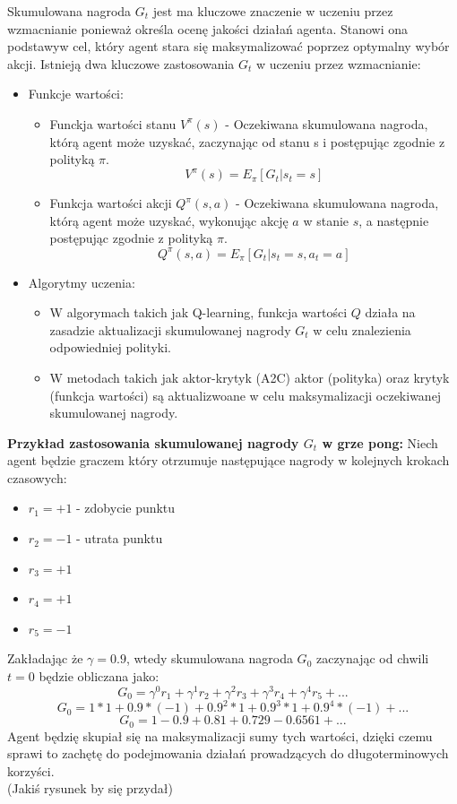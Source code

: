 \documentclass[a4paper, 12pt]{article}
\begin{document}
    Skumulowana nagroda \( G_t \) jest ma kluczowe znaczenie w uczeniu przez wzmacnianie ponieważ określa ocenę jakości działań agenta. Stanowi ona podstawyw cel, który agent stara się 
    maksymalizować poprzez optymalny wybór akcji. Istnieją dwa kluczowe zastosowania \( G_t \) w uczeniu przez wzmacnianie:
    \begin{itemize}
        \item Funkcje wartości:
        \begin{itemize}
            \item Funckja wartości stanu \( V^\pi(s) \) - Oczekiwana skumulowana nagroda, którą agent może uzyskać, zaczynając od stanu s i postępując zgodnie z polityką \( \pi \).
            \[ V^\pi(s) = E_\pi[G_t|s_t=s] \]
            \item Funkcja wartości akcji \( Q^\pi(s,a) \) - Oczekiwana skumulowana nagroda, którą agent może uzyskać, wykonując akcję \( a \) w stanie \( s \),
            a następnie postępując zgodnie z polityką \( \pi \).
            \[ Q^\pi(s,a) = E_\pi[G_t|s_t=s,a_t=a] \]
        \end{itemize}
        \item Algorytmy uczenia:
        \begin{itemize}
            \item W algorymach takich jak Q-learning, funkcja wartości \( Q \) działa na zasadzie aktualizacji skumulowanej nagrody \( G_t \) w celu znalezienia odpowiedniej polityki.
            \item W metodach takich jak aktor-krytyk (A2C) aktor (polityka) oraz krytyk (funkcja wartości) są aktualizwoane w celu maksymalizacji oczekiwanej skumulowanej nagrody.
        \end{itemize}
    \end{itemize}
    \textbf{Przykład zastosowania skumulowanej nagrody \( G_t \) w grze pong:}
    Niech agent będzie graczem który otrzumuje następujące nagrody w kolejnych krokach czasowych:
    \begin{itemize}
        \item \( r_1 = +1 \) - zdobycie punktu
        \item \( r_2 = -1 \) - utrata punktu
        \item \( r_3 = +1 \)
        \item \( r_4 = +1 \)
        \item \( r_5 = -1 \)
    \end{itemize}
    Zakładając że \( \gamma = 0.9 \), wtedy skumulowana nagroda \( G_0 \) zaczynając od chwili \( t = 0 \) będzie obliczana jako:
    \[ G_0 = \gamma^0r_1 + \gamma^1r_2 + \gamma^2r_3 + \gamma^3r_4 + \gamma^4r_5 + ... \]
    \[ G_0 = 1 * 1 + 0.9 * (-1) + 0.9^2 * 1 + 0.9^3 * 1 + 0.9^4 * (-1) + ... \]
    \[ G_0 = 1 - 0.9 + 0.81 + 0.729 - 0.6561 + ... \]
    Agent będzię skupiał się na maksymalizacji sumy tych wartości, dzięki czemu sprawi to zachętę do podejmowania działań prowadzących do długoterminowych korzyści. \\
    (Jakiś rysunek by się przydał)
\end{document}

